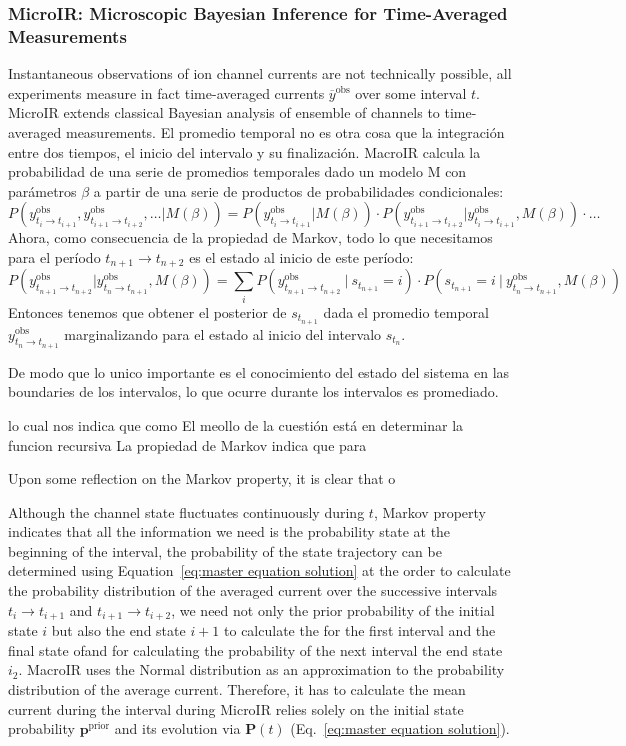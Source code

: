\documentclass[9pt]{elife}
\begin{document}
	\subsubsection{MicroIR: Microscopic Bayesian Inference for Time-Averaged Measurements}
	Instantaneous observations of ion channel currents are not technically possible, all experiments measure in fact time-averaged currents \(\overline{y}^{\text{obs}}\) over some interval \(t\). MicroIR extends classical Bayesian analysis of ensemble of channels to time-averaged measurements. El promedio temporal no es otra cosa que la integración entre dos tiempos, el inicio del intervalo y su finalización. MacroIR calcula la probabilidad de una serie de promedios temporales dado un modelo M con parámetros $\beta$ a partir de una serie de productos de probabilidades condicionales:
	$$
	P(y^{\text{obs}}_{t_{i}\rightarrow t_{i+1}},y^{\text{obs}}_{t_{i+1}\rightarrow t_{i+2}},\dots | M(\beta))=
	P(y^{\text{obs}}_{t_{i}\rightarrow t_{i+1}} | M(\beta)) \cdot P(y^{\text{obs}}_{t_{i+1}\rightarrow t_{i+2}}|y^{\text{obs}}_{t_{i}\rightarrow t_{i+1}}, M(\beta))\cdot \dots
	$$
	Ahora, como consecuencia de la propiedad de Markov, todo lo que necesitamos para el período $t_{n+1}\rightarrow t_{n+2}$ es el estado al inicio de este período: 
	$$
	P(y^{\text{obs}}_{t_{n+1}\rightarrow t_{n+2}}|y^{\text{obs}}_{t_{n}\rightarrow t_{n+1}}, M(\beta))= \sum_{i} P(y^{\text{obs}} _{t_{n+1}\rightarrow t_{n+2}}~|~s_{t_{n+1}}=i) \cdot P(s_{t_{n+1}}=i~|~y^{\text{obs}}_{t_{n}\rightarrow t_{n+1}}, M(\beta))
	$$
	Entonces tenemos que obtener el posterior de $s_{t_{n+1}}$ dada el promedio temporal $y^{\text{obs}}_{t_{n}\rightarrow t_{n+1}}$ marginalizando para el estado al inicio del intervalo $s_{t_n}$. 
	
	De modo que lo unico importante es el conocimiento del estado del sistema en las boundaries de los intervalos, lo que ocurre durante los intervalos es promediado. 
	
	lo cual nos indica que como 
	El meollo de la cuestión está en determinar la funcion recursiva 
	La propiedad de Markov indica que para 
	
	Upon some reflection on the Markov property, it is clear that o 
	
	
	Although the channel state fluctuates continuously during \(t\), Markov property indicates that all the information we need is the probability state at the beginning of the interval, the probability of the state trajectory can be determined using Equation~\ref{eq:master equation solution}
	at the  order to calculate the probability distribution of the averaged current over the successive intervals $t_{i}\rightarrow t_{i+1}$ and $t_{i+1}\rightarrow t_{i+2}$, we need not only the prior probability of the initial state $i$ but also the end state $i+1$ to calculate the for the first interval and the final state ofand for calculating the probability of the next interval  the end state $i_2$. 
	MacroIR uses the Normal distribution as an approximation to the probability distribution of the average current. Therefore, it has to calculate the mean current during the interval  during 
	MicroIR relies solely on the initial state probability \(\boldsymbol{p}^{\text{prior}}\) and its evolution via \(\mathbf{P}(t)\) (Eq.~\ref{eq:master equation solution}).
	
\end{document}
